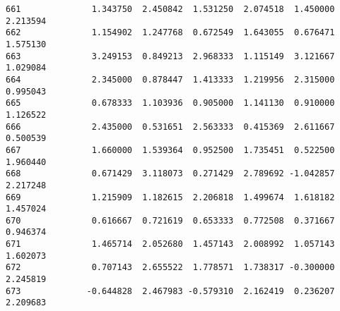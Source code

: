 \documentclass[11pt]{article}
\begin{document}
\begin{Verbatim}[commandchars=\\\{\}]
661              1.343750  2.450842  1.531250  2.074518  1.450000  2.213594
662              1.154902  1.247768  0.672549  1.643055  0.676471  1.575130
663              3.249153  0.849213  2.968333  1.115149  3.121667  1.029084
664              2.345000  0.878447  1.413333  1.219956  2.315000  0.995043
665              0.678333  1.103936  0.905000  1.141130  0.910000  1.126522
666              2.435000  0.531651  2.563333  0.415369  2.611667  0.500539
667              1.660000  1.539364  0.952500  1.735451  0.522500  1.960440
668              0.671429  3.118073  0.271429  2.789692 -1.042857  2.217248
669              1.215909  1.182615  2.206818  1.499674  1.618182  1.457024
670              0.616667  0.721619  0.653333  0.772508  0.371667  0.946374
671              1.465714  2.052680  1.457143  2.008992  1.057143  1.602073
672              0.707143  2.655522  1.778571  1.738317 -0.300000  2.245819
673             -0.644828  2.467983 -0.579310  2.162419  0.236207  2.209683

    \end{Verbatim}


    
    
    
    
\end{document}
